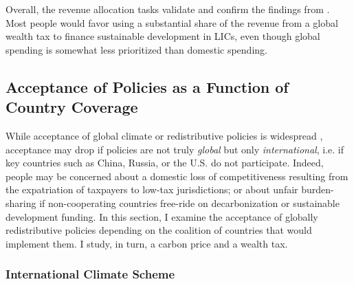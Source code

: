 \documentclass[12pt,english]{article}
\begin{document}
\begin{bibunit}
Overall, the revenue allocation tasks validate and confirm the findings from \cite{fabre_majority_2025}. Most people would favor using a substantial share of the revenue from a global wealth tax to finance sustainable development in LICs, even though global spending is somewhat less prioritized than domestic spending. 


\subsection{Acceptance of %
Policies as a Function of Country Coverage\label{sec:coverage}}

While acceptance of global climate or redistributive policies is widespread \citep{fabre_majority_2025,cappelen_majority_2025}, acceptance may drop if policies are not truly \textit{global} but only \textit{international}, i.e. if key countries such as China, Russia, or the U.S. do not participate. Indeed, people may be concerned about a domestic loss of competitiveness resulting from the expatriation of taxpayers to low-tax jurisdictions; or about unfair burden-sharing if non-cooperating countries free-ride on decarbonization or sustainable development funding. %
In this section, I examine the acceptance of globally redistributive policies depending on the coalition of countries that would implement them. I study, in turn, a carbon price and a wealth tax.

\subsubsection{International Climate Scheme}\label{subsec:ics}



\end{bibunit}
\end{document}
